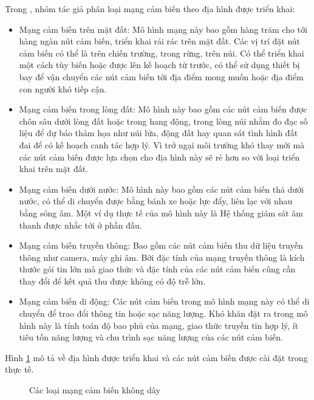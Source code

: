 \documentclass{hust}
\begin{document}
Trong \cite{koviwireless}, nhóm tác giả phân loại mạng cảm biến theo địa hình được triển khai:
\begin{itemize}
	\item Mạng cảm biến trên mặt đất: Mô hình mạng này bao gồm hàng trăm cho tới hàng ngàn nút cảm biến, triển khai rải rác trên mặt đất. Các vị trí đặt nút cảm biến có thể là trên chiến trường, trong rừng, trên núi. Có thể triển khai một cách tùy biến hoặc được lên kế hoạch từ trước, có thể sử dụng thiết bị bay để vận chuyển các nút cảm biến tới địa điểm mong muốn hoặc địa điểm con người khó tiếp cận.
	\item Mạng cảm biến trong lòng đất: Mô hình này bao gồm các nút cảm biến được chôn sâu dưới lòng đất hoặc trong hang động, trong lòng núi nhằm đo đạc số liệu để dự báo thảm họa như núi lửa, động đất hay quan sát tình hình đất đai để có kế hoạch canh tác hợp lý. Vì trở ngại môi trường khó thay mới mà các nút cảm biến được lựa chọn cho địa hình này sẽ rẻ hơn so với loại triển khai trên mặt đất. 
	\item Mạng cảm biến dưới nước: Mô hình này bao gồm các nút cảm biến thả dưới nước, có thể di chuyển được bằng bánh xe hoặc lực đẩy, liên lạc với nhau bằng sóng âm. Một ví dụ thực tế của mô hình này là Hệ thống giám sát âm thanh được nhắc tới ở phần đầu.
	\item Mạng cảm biến truyền thông: Bao gồm các nút cảm biến thu dữ liệu truyền thông như camera, máy ghi âm. Bởi đặc tính của mạng truyền thông là kích thước gói tin lớn mà giao thức và đặc tính của các nút cảm biến cũng cần thay đổi để kết quả thu được không có độ trễ lớn. 
	\item Mạng cảm biến di động: Các nút cảm biến trong mô hình mạng này có thể di chuyển để trao đổi thông tin hoặc sạc năng lượng. Khó khăn đặt ra trong mô hình này là tính toán độ bao phủ của mạng, giao thức truyền tin hợp lý, ít tiêu tốn năng lượng và chu trình sạc năng lượng của các nút cảm biến.
\end{itemize}

Hình \ref{fig:wsn-types} mô tả về địa hình được triển khai và các nút cảm biến được cài đặt trong thực tế.

\begin{figure}[htb]
	\caption{Các loại mạng cảm biến không dây}\label{fig:wsn-types}
\end{figure}
\end{document}
